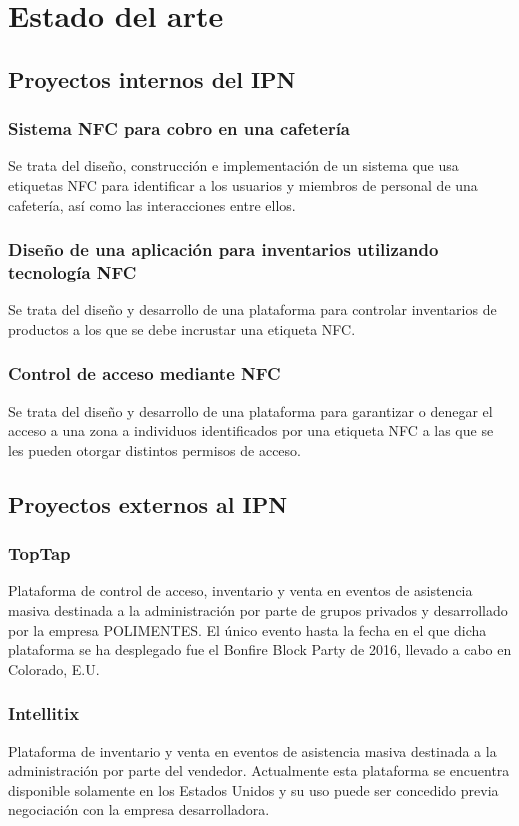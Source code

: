 \section{Estado del arte}\label{sec:stateoftheart}

\subsection{Proyectos internos del IPN}

\subsubsection*{Sistema NFC para cobro en una cafetería}

Se trata del diseño, construcción e implementación de un sistema que usa etiquetas NFC para identificar a los usuarios y miembros de personal de una cafetería, así como las interacciones entre ellos.

\subsubsection*{Diseño de una aplicación para inventarios utilizando tecnología NFC}

Se trata del diseño y desarrollo de una plataforma para controlar inventarios de productos a los que se debe incrustar una etiqueta NFC.

\subsubsection*{Control de acceso mediante NFC}

Se trata del diseño y desarrollo de una plataforma para garantizar o denegar el acceso a una zona a individuos identificados por una etiqueta NFC a las que se les pueden otorgar distintos permisos de acceso.

\subsection{Proyectos externos al IPN}

\subsubsection*{TopTap}

Plataforma de control de acceso, inventario y venta en eventos de asistencia masiva destinada a la administración por parte de grupos privados y desarrollado por la empresa POLIMENTES. El único evento hasta la fecha en el que dicha plataforma se ha desplegado fue el Bonfire Block Party de 2016, llevado a cabo en Colorado, E.U.

\subsubsection*{Intellitix}

Plataforma de inventario y venta en eventos de asistencia masiva destinada a la administración por parte del vendedor. Actualmente esta plataforma se encuentra disponible solamente en los Estados Unidos y su uso puede ser concedido previa negociación con la empresa desarrolladora.
